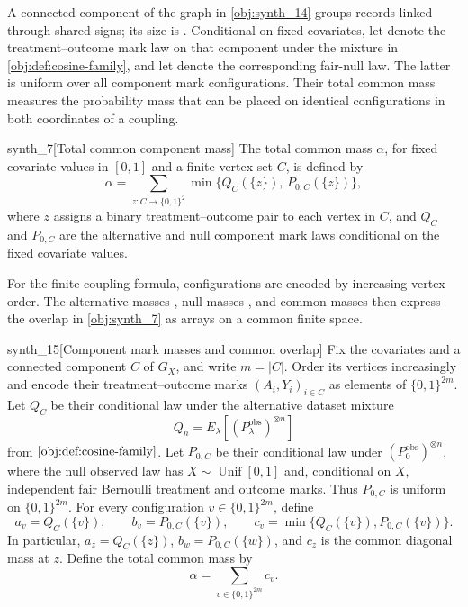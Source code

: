 \documentclass[11pt]{article}
\begin{document}
A connected component  of the graph in \cref{obj:synth_14} groups records linked through shared signs; its size is . Conditional on fixed covariates, let  denote the treatment--outcome mark law on that component under the mixture in \cref{obj:def:cosine-family}, and let  denote the corresponding fair-null law. The latter is uniform over all component mark configurations. Their total common mass  measures the probability mass that can be placed on identical configurations in both coordinates of a coupling.

\begin{definitionv}{synth_7}[Total common component mass]
The total common mass \(\alpha\), for fixed covariate values in \([0,1]\) and a finite vertex set \(C\), is defined by
\[
\alpha
=
\sum_{z:C\to\{0,1\}^2}
\min\bigl\{Q_C(\{z\}),\,P_{0,C}(\{z\})\bigr\},
\]
where \(z\) assigns a binary treatment–outcome pair to each vertex in \(C\), and \(Q_C\) and \(P_{0,C}\) are the alternative and null component mark laws conditional on the fixed covariate values.
\end{definitionv}

For the finite coupling formula, configurations are encoded by increasing vertex order. The alternative masses , null masses , and common masses  then express the overlap in \cref{obj:synth_7} as arrays on a common finite space.

\begin{definitionv}{synth_15}[Component mark masses and common overlap]
Fix the covariates and a connected component \(C\) of \(G_X\), and write \(m=|C|\). Order its vertices increasingly and encode their treatment–outcome marks \((A_i,Y_i)_{i\in C}\) as elements of \(\{0,1\}^{2m}\). Let \(Q_C\) be their conditional law under the alternative dataset mixture
\[
Q_n=E_\lambda[(P_\lambda^{\mathrm{obs}})^{\otimes n}]
\]
from \(\cref{obj:def:cosine-family}\). Let \(P_{0,C}\) be their conditional law under \((P_0^{\mathrm{obs}})^{\otimes n}\), where the null observed law has \(X\sim\operatorname{Unif}[0,1]\) and, conditional on \(X\), independent fair Bernoulli treatment and outcome marks. Thus \(P_{0,C}\) is uniform on \(\{0,1\}^{2m}\). For every configuration \(v\in\{0,1\}^{2m}\), define
\[
a_v=Q_C(\{v\}),\qquad
b_v=P_{0,C}(\{v\}),\qquad
c_v=\min\{Q_C(\{v\}),P_{0,C}(\{v\})\}.
\]
In particular, \(a_z=Q_C(\{z\})\), \(b_w=P_{0,C}(\{w\})\), and \(c_z\) is the common diagonal mass at \(z\). Define the total common mass by
\[
\alpha=\sum_{v\in\{0,1\}^{2m}}c_v.
\]
\end{definitionv}
\end{document}
